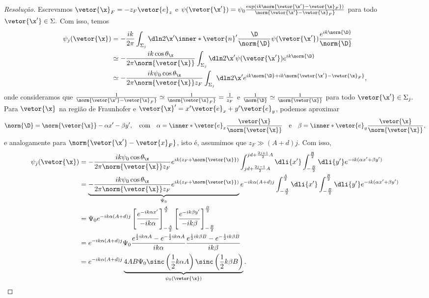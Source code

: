 \begin{proof}[Resolução]
    Escrevamos \(\vetor{\x}_F = -z_F \vetor{e}_z\) e \(\psi(\vetor{\x'}) = \psi_0 \frac{\exp(ik\norm{\vetor{\x'} - \vetor{\x}_F})}{\norm{\vetor{\x'} - \vetor{\x}_F}}\) para todo \(\vetor{\x'} \in \Sigma.\) Com isso, temos
    \begin{align*}
        \psi_j(\vetor{\x}) &= - \frac{i k}{2\pi} \int_{\Sigma_j} \dln2{\x'} \inner*{\vetor{n}'}{\frac{\D}{\norm{\D}}} \psi(\vetor{\x'}) \frac{e^{ik \norm{\D}}}{\norm{\D}}\\
                         &\simeq -\frac{ik \cos\theta_{\x}}{2\pi \norm{\vetor{\x}}} \int_{\Sigma_j} \dln2{\x'} \psi(\vetor{\x'}) e^{ik \norm{\D}}\\
                         &\simeq -\frac{ik \psi_0 \cos\theta_{\x}}{2\pi \norm{\vetor{\x}} z_F} \int_{\Sigma_j} \dln2{\x'} e^{ik \norm{\D} + ik \norm{\vetor{\x'} - \vetor{\x}_F}},
    \end{align*}
    onde consideramos que \(\frac{1}{\norm{\vetor{\x'} - \vetor{\x}_F}} \simeq \frac{1}{\norm{\vetor{\x}_F}} = \frac{1}{z_F}\) e \(\frac{1}{\norm{\D}} \simeq \frac{1}{\norm{\vetor{\x}}}\) para todo \(\vetor{\x'} \in \Sigma_j.\) Para \(\vetor{\x}\) na região de Fraunhofer e \(\vetor{\x}' = x' \vetor{e}_x + y'\vetor{e}_y\), podemos aproximar
    \begin{equation*}
        \norm{\D} = \norm{\vetor{\x}} - \alpha x' - \beta y',\quad\text{com}\quad \alpha = \inner*{\vetor{e}_x}{\frac{\vetor{\x}}{\norm{\vetor{\x}}}}\quad\text{e}\quad\beta = \inner*{\vetor{e}_y}{\frac{\vetor{\x}}{\norm{\vetor{\x}}}},
    \end{equation*}
    e analogamente para \(\norm{\vetor{\x'} - \vetor{x}_F}\), isto é, assumimos que \(z_F \gg (A + d)j\). Com isso, 
    \begin{align*}
        \psi_j(\vetor{\x}) &= -\frac{ik \psi_0 \cos\theta_{\x}}{2\pi \norm{\vetor{\x}} z_F} e^{ik (z_F + \norm{\vetor{\x}})} \int_{jd + \frac{2j - 1}{2}A}^{jd + \frac{2j + 1}{2}A} \dli{x'} \int_{-\frac{B}{2}}^{\frac{B}{2}} \dli{y'} e^{-ik (\alpha x' + \beta y')}\\
                           &= \underbrace{-\frac{ik \psi_0 \cos\theta_{\x}}{2\pi \norm{\vetor{\x}} z_F} e^{ik(z_F + \norm{\vetor{\x}})}}_{\Psi_0} e^{- ik\alpha(A + d)j} \int_{-\frac{A}{2}}^{\frac{A}{2}} \dli{x'} \int_{-\frac{B}{2}}^{\frac{B}{2}} \dli{y'} e^{-ik (\alpha x' + \beta y')}\\
                           &= \Psi_0 e^{-ik\alpha(A + d)j} \left[\frac{e^{-ik \alpha x'}}{-ik \alpha}\right]_{-\frac{A}{2}}^{\frac{A}{2}} \left[\frac{e^{-ik \beta y'}}{-ik \beta}\right]_{-\frac{B}{2}}^{\frac{B}{2}}\\
                           &= e^{-ik\alpha(A + d)j} \Psi_0  \frac{e^{\frac12 ik \alpha A} - e^{-\frac12 ik \alpha A}}{ik \alpha}\frac{e^{\frac12 ik \beta B} - e^{-\frac12 ik \beta B}}{ik \beta}\\
                           &= e^{-ik \alpha(A + d)j} \underbrace{4AB \Psi_0 \sinc\left(\frac12 k \alpha A\right) \sinc\left(\frac12 k \beta B\right)}_{\psi_0(\vetor{\x})}.
    \end{align*}


\end{proof}
